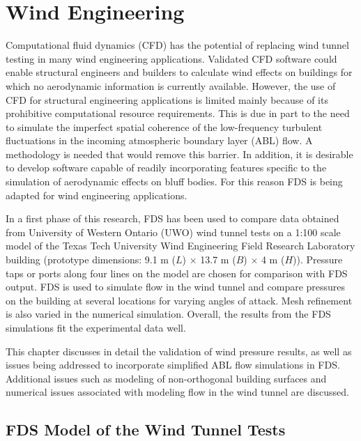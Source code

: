 
\chapter{Wind Engineering}

Computational fluid dynamics (CFD) has the potential of replacing wind tunnel testing in many wind engineering applications. Validated CFD software could enable structural engineers and builders to calculate wind effects on buildings for which no aerodynamic information is currently available. However, the use of CFD for structural engineering applications is limited mainly because of its prohibitive computational resource requirements. This is due in part to the need to simulate the imperfect spatial coherence of the low-frequency turbulent fluctuations in the incoming atmospheric boundary layer (ABL) flow.  A methodology is needed that would remove this barrier. In addition, it is desirable to develop software capable of readily incorporating features specific to the simulation of aerodynamic effects on bluff bodies. For this reason FDS is being adapted for wind engineering applications.

In a first phase of this research, FDS has been used to compare data obtained from University of Western Ontario (UWO) wind tunnel tests on a 1:100 scale model of the Texas Tech University Wind Engineering Field Research Laboratory building (prototype dimensions: 9.1 m ($L$) $\times$ 13.7 m ($B$) $\times$ 4 m ($H$)). Pressure taps or ports along four lines on the model are chosen for comparison with FDS output. FDS is used to simulate flow in the wind tunnel and compare pressures on the building at several locations for varying angles of attack. Mesh refinement is also varied in the numerical simulation. Overall, the results from the FDS simulations fit the experimental data well.

This chapter discusses in detail the validation of wind pressure results, as well as issues being addressed to incorporate simplified ABL flow simulations in FDS. Additional issues such as modeling of non-orthogonal building surfaces and numerical issues associated with modeling flow in the wind tunnel are discussed.


\section{FDS Model of the Wind Tunnel Tests}

